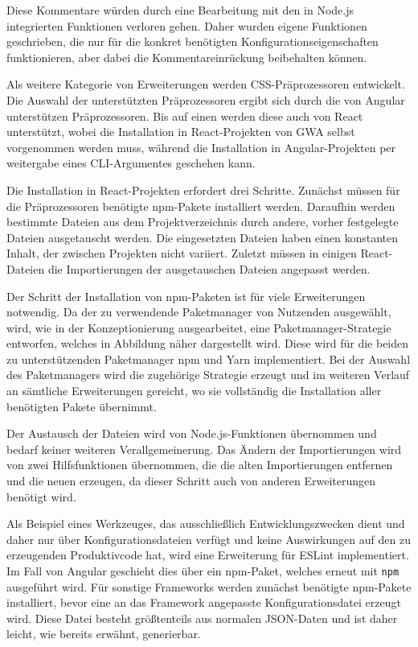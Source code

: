 Diese Kommentare würden durch eine Bearbeitung mit den in Node.js integrierten Funktionen verloren gehen. Daher wurden eigene Funktionen geschrieben, die nur für die konkret benötigten Konfigurationseigenschaften funktionieren, aber dabei die Kommentareinrückung beibehalten können.

Als weitere Kategorie von Erweiterungen werden CSS-Präprozessoren entwickelt. Die Auswahl der unterstützten Präprozessoren ergibt sich durch die von Angular unterstützen Präprozessoren. Bis auf einen werden diese auch von React unterstützt, wobei die Installation in React-Projekten von \gls{GWA} selbst vorgenommen werden muss, während die Installation in Angular-Projekten per weitergabe eines \gls{CLI}-Argumentes geschehen kann.

Die Installation in React-Projekten erfordert drei Schritte. Zunächst müssen für die Präprozessoren benötigte \gls{npm}-Pakete installiert werden. Daraufhin werden bestimmte Dateien aus dem Projektverzeichnis durch andere, vorher festgelegte Dateien ausgetauscht werden. Die eingesetzten Dateien haben einen konstanten Inhalt, der zwischen Projekten nicht variiert. Zuletzt müssen in einigen React-Dateien die Importierungen der ausgetauschen Dateien angepasst werden.

Der Schritt der Installation von \gls{npm}-Paketen ist für viele Erweiterungen notwendig. Da der zu verwendende Paketmanager von Nutzenden ausgewählt, wird, wie in der Konzeptionierung ausgearbeitet, eine Paketmanager-Strategie entworfen, welches in Abbildung \missingQuote näher dargestellt wird. Diese wird für die beiden zu unterstützenden Paketmanager \gls{npm} und Yarn implementiert. Bei der Auswahl des Paketmanagers wird die zugehörige Strategie erzeugt und im weiteren Verlauf an sämtliche Erweiterungen gereicht, wo sie vollständig die Installation aller benötigten Pakete übernimmt.

Der Austausch der Dateien wird von Node.js-Funktionen übernommen und bedarf keiner weiteren Verallgemeinerung. Das Ändern der Importierungen wird von zwei Hilfsfunktionen übernommen, die die alten Importierungen entfernen und die neuen erzeugen, da dieser Schritt auch von anderen Erweiterungen benötigt wird.

Als Beispiel eines Werkzeuges, das ausschließlich Entwicklungszwecken dient und daher nur über Konfigurationsdateien verfügt und keine Auswirkungen auf den zu erzeugenden Produktivcode hat, wird eine Erweiterung für ESLint implementiert. Im Fall von Angular geschieht dies über ein \gls{npm}-Paket, welches erneut mit \verb/npm/ ausgeführt wird. Für sonstige Frameworks werden zunächst benötigte \gls{npm}-Pakete installiert, bevor eine an das Framework angepasste Konfigurationsdatei erzeugt wird. Diese Datei besteht größtenteils aus normalen \gls{JSON}-Daten und ist daher leicht, wie bereits erwähnt, generierbar.

